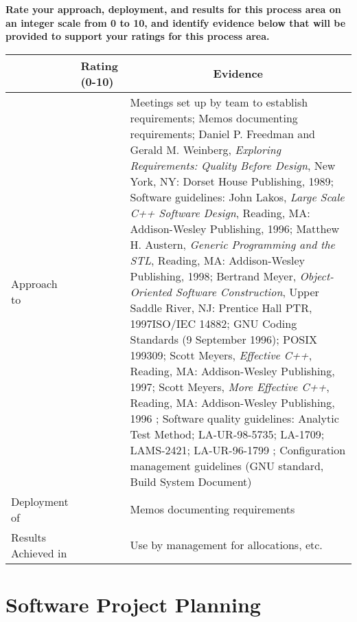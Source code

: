 \documentclass{article}
\newcommand{\KPAname}{}
\let\KPAsection=\section
\renewcommand{\section}[1]{\renewcommand{\KPAname}{#1}\KPAsection{#1}}
\newcounter{approach}[section]
\newcounter{deployment}[section]
\newcounter{result}[section]
\newenvironment{KPARate}
{
    {\bf Rate your approach, deployment, and results for
    this process area on an integer scale from 0 to 10, and 
    identify evidence below that will be provided to support your
    ratings for this process area.}
    \begin{center}
    \begin{tabular}{|p{1.0in}|p{0.5in}|p{5.0in}|} \hline
    & Rating (0-10) & \multicolumn{1}{c|}{Evidence} \\ \hline
}
{
    \end{tabular}
    \end{center}
}
\newcommand{\Approach}[1]
{
    Approach to \KPAname & \arabic{approach} & #1 \\ \hline
}
\newcommand{\Deployment}[1]
{
    Deployment of \KPAname & \arabic{deployment} & #1 \\ \hline
}
\newcommand{\Results}[1]
{
    Results Achieved in \KPAname & \arabic{result} & #1 \\ \hline
}
\begin{document}
\begin{KPARate}
\Approach{Meetings set up by team to establish requirements; Memos
documenting requirements; Daniel P. Freedman and Gerald M. Weinberg, {\em
              Exploring Requirements: Quality Before Design}, New
              York, NY: Dorset House Publishing, 1989; Software
guidelines: John Lakos, {\em Large Scale C++ Software Design},
              Reading, MA: Addison-Wesley Publishing, 1996;
              Matthew H. Austern, {\em Generic Programming and the
              STL}, Reading, MA: Addison-Wesley Publishing, 1998;
              Bertrand Meyer, {\em Object-Oriented Software
              Construction}, Upper Saddle River, NJ: Prentice Hall
	      PTR, 1997ISO/IEC 14882; GNU Coding Standards (9 September 1996); 
	      POSIX 199309; Scott Meyers, {\em Effective C++},
              Reading, MA: Addison-Wesley Publishing, 1997; Scott
              Meyers, {\em More Effective C++}, Reading, MA:
              Addison-Wesley Publishing, 1996
; Software quality guidelines: Analytic Test Method; LA-UR-98-5735; LA-1709; LAMS-2421;
              LA-UR-96-1799
; Configuration management guidelines (GNU standard, Build
System Document)}
\Deployment{Memos documenting requirements}
\Results{Use by management for allocations, etc.}
\end{KPARate}

\newpage
\section{Software Project Planning}
\end{document}
